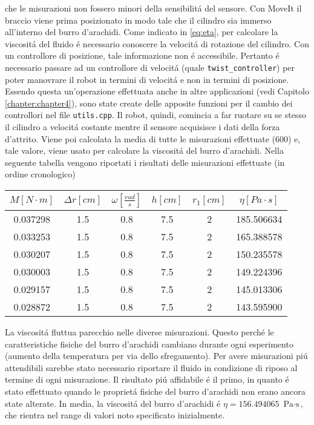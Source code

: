 che le misurazioni non fossero minori della sensibilit\'{a} del sensore. 
Con MoveIt il braccio viene prima posizionato in modo tale che il cilindro sia immerso all'interno del burro d'arachidi. 
Come indicato in \ref{eq:eta}, per calcolare la viscosit\'{a} del fluido \'{e} necessario conoscere 
la velocit\'{a} di rotazione del cilindro. Con un controllore di posizione, tale informazione non \'{e} accessibile. 
Pertanto \'{e} necessario passare ad un controllore di velocit\'{a} (quale \verb|twist_controller|) per poter manovrare il robot in 
termini di velocit\'{a} e non in termini di posizione. Essendo questa un'operazione effettuata anche in altre applicazioni (vedi  
Capitolo \ref{chapter:chapter4}), sono state create delle apposite funzioni per il cambio dei controllori nel file \verb|utils.cpp|. 
Il robot, quindi, comincia a far ruotare su se stesso il cilindro a velocit\'{a} costante mentre il sensore acquisisce i dati della 
forza d'attrito. 
Viene poi calcolata la media di tutte le misurazioni effettuate (600) e, tale valore, viene usato per calcolare la viscosit\'{a} 
del burro d'arachidi. 
Nella seguente tabella vengono riportati i risultati delle misurazioni effettuate (in ordine cronologico)
\begin{center}
    \begin{tabular}{ ||c|c|c|c|c|c|| } 
     \hline
     $M \left[N \cdot m\right]$ & $\Delta r \left[cm\right]$ & $\omega \left[\frac{rad}{s}\right]$ & $h \left[cm\right]$ & $r_{1} \left[cm\right]$ & $\eta \left[Pa \cdot s\right]$\\
     \hline\hline 
     0.037298 & 1.5 & 0.8 & 7.5 & 2 & 185.506634 \\ 
     0.033253 & 1.5 & 0.8 & 7.5 & 2 & 165.388578 \\ 
     0.030207 & 1.5 & 0.8 & 7.5 & 2 & 150.235578 \\ 
     0.030003 & 1.5 & 0.8 & 7.5 & 2 & 149.224396 \\ 
     0.029157 & 1.5 & 0.8 & 7.5 & 2 & 145.013306 \\ 
     0.028872 & 1.5 & 0.8 & 7.5 & 2 & 143.595900 \\ 
     \hline
    \end{tabular}
\end{center}
La viscosit\'{a} fluttua parecchio nelle diverse misurazioni. Questo perch\'{e} le caratteristiche fisiche del burro d'arachidi 
cambiano durante ogni esperimento (aumento della temperatura per via dello sfregamento). Per avere misurazioni pi\'{u} attendibili 
sarebbe stato necessario riportare il fluido in condizione di riposo al termine di ogni misurazione. Il risultato pi\'{u} affidabile 
\'{e} il primo, in quanto \'{e} stato effettuato quando le propriet\'{a} fisiche del burro d'arachidi non erano ancora 
state alterate.
In media, la viscosit\'{a} del burro d'arachidi \'{e} $\eta = 156.494065$ $\text{Pa} \cdot \text{s}$, che rientra nel range di 
valori noto specificato inizialmente. 

